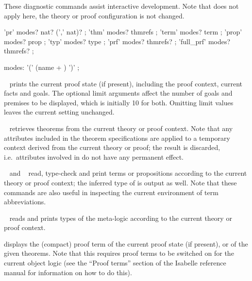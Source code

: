 \begin{isabellebody}
\begin{isamarkuptext}
  These diagnostic commands assist interactive development.  Note that
   does not apply here, the theory or proof
  configuration is not changed.

  \begin{rail}
    'pr' modes? nat? (',' nat)?
    ;
    'thm' modes? thmrefs
    ;
    'term' modes? term
    ;
    'prop' modes? prop
    ;
    'typ' modes? type
    ;
    'prf' modes? thmrefs?
    ;
    'full\_prf' modes? thmrefs?
    ;

    modes: '(' (name + ) ')'
    ;
  \end{rail}

  \begin{descr}

  \item [\isa{\isacommand{pr}}~\isa{goals{\isacharcomma}\ prems}] prints the current
  proof state (if present), including the proof context, current facts
  and goals.  The optional limit arguments affect the number of goals
  and premises to be displayed, which is initially 10 for both.
  Omitting limit values leaves the current setting unchanged.

  \item [\isa{\isacommand{thm}}~\isa{a\isactrlsub {\isadigit{1}}\ {\isasymdots}\ a\isactrlsub n}] retrieves
  theorems from the current theory or proof context.  Note that any
  attributes included in the theorem specifications are applied to a
  temporary context derived from the current theory or proof; the
  result is discarded, i.e.\ attributes involved in  do not have any permanent effect.

  \item [\isa{\isacommand{term}}~\isa{t} and \isa{\isacommand{prop}}~\isa{{\isasymphi}}]
  read, type-check and print terms or propositions according to the
  current theory or proof context; the inferred type of  is
  output as well.  Note that these commands are also useful in
  inspecting the current environment of term abbreviations.

  \item [\isa{\isacommand{typ}}~\isa{{\isasymtau}}] reads and prints types of the
  meta-logic according to the current theory or proof context.

  \item [\isa{\isacommand{prf}}] displays the (compact) proof term of the
  current proof state (if present), or of the given theorems. Note
  that this requires proof terms to be switched on for the current
  object logic (see the ``Proof terms'' section of the Isabelle
  reference manual for information on how to do this).


\end{descr}
\end{isamarkuptext}
\end{isabellebody}
